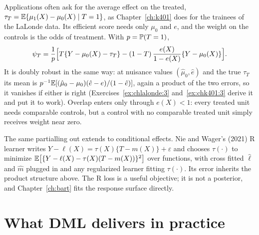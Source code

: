 Applications often ask for the average effect on the treated, $\tau_T = \mathbb{E}\{\mu_1(X) - \mu_0(X) \mid T = 1\}$, as Chapter~\ref{ch:k401} does for the trainees of the LaLonde data. Its efficient score needs only $\mu_0$ and $e$, and the weight on the controls is the odds of treatment. With $p = \mathbb{P}(T = 1)$,
\begin{equation}
\psi_T = \frac{1}{p}\Bigl[T\{Y - \mu_0(X) - \tau_T\} - (1 - T)\,\frac{e(X)}{1 - e(X)}\{Y - \mu_0(X)\}\Bigr].
\label{eq:aipw:att}
\end{equation}
It is doubly robust in the same way: at nuisance values $(\hat\mu_0, \hat e)$ and the true $\tau_T$ its mean is $p^{-1}\mathbb{E}[(\hat\mu_0 - \mu_0)(\hat e - e)/(1 - \hat e)]$, again a product of the two errors, so it vanishes if either is right (Exercises~\ref{ex:chlalonde:3} and~\ref{ex:chk401:3} derive it and put it to work). Overlap enters only through $e(X) < 1$: every treated unit needs comparable controls, but a control with no comparable treated unit simply receives weight near zero.

The same partialling out extends to conditional effects. Nie and Wager's (2021) R learner writes $Y - \ell(X) = \tau(X)\{T - m(X)\} + \varepsilon$ and chooses $\tau(\cdot)$ to minimize $\mathbb{E}\bigl[\{Y - \ell(X) - \tau(X)(T - m(X))\}^2\bigr]$ over functions, with cross fitted $\hat\ell$ and $\hat m$ plugged in and any regularized learner fitting $\tau(\cdot)$. Its error inherits the product structure above. The R loss is a useful objective; it is not a posterior, and Chapter~\ref{ch:bart} fits the response surface directly.

\section{What DML delivers in practice}\label{sec:dml:practice}

